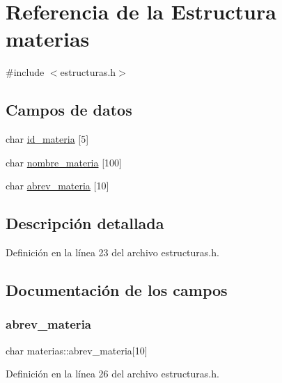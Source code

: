 \hypertarget{structmaterias}{}\section{Referencia de la Estructura materias}
\label{structmaterias}


{\ttfamily \#include $<$estructuras.\+h$>$}

\subsection*{Campos de datos}
\begin{DoxyCompactItemize}
\item 
char \mbox{\hyperlink{structmaterias_ae285579bc06c3da15f087e1c1b829068}{id\+\_\+materia}} \mbox{[}5\mbox{]}
\item 
char \mbox{\hyperlink{structmaterias_a5d39a4c56dcd41b1cdc9873c5873400e}{nombre\+\_\+materia}} \mbox{[}100\mbox{]}
\item 
char \mbox{\hyperlink{structmaterias_a3cbb90c8931ebfaa78e3c26679845746}{abrev\+\_\+materia}} \mbox{[}10\mbox{]}
\end{DoxyCompactItemize}


\subsection{Descripción detallada}


Definición en la línea 23 del archivo estructuras.\+h.



\subsection{Documentación de los campos}
\mbox{\label{structmaterias_a3cbb90c8931ebfaa78e3c26679845746}} 
\subsubsection{\texorpdfstring{abrev\+\_\+materia}{abrev\_materia}}
{\footnotesize\ttfamily char materias\+::abrev\+\_\+materia\mbox{[}10\mbox{]}}



Definición en la línea 26 del archivo estructuras.\+h.

\mbox{\label{structmaterias_ae285579bc06c3da15f087e1c1b829068}} 
